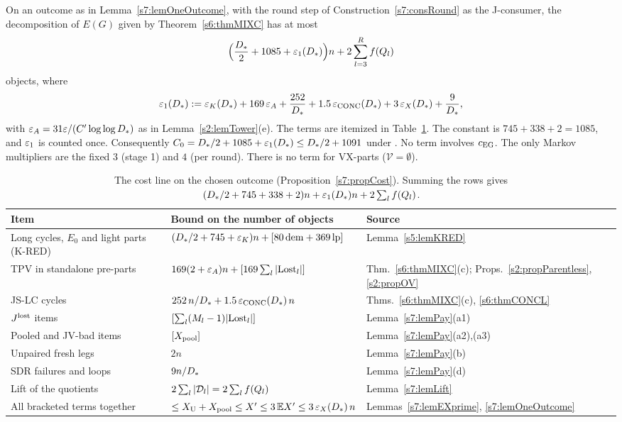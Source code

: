 \begin{proposition}\label{s7:propCost}
On an outcome as in Lemma~\ref{s7:lemOneOutcome}, with the round step of
Construction~\ref{s7:consRound} as the J-consumer, the decomposition of $E(G)$
given by Theorem~\ref{s6:thmMIXC} has at most
\[
\Bigl(\frac{D_{*}}{2}+1085+\varepsilon_{1}(D_{*})\Bigr)n+2\sum_{l=3}^{R}f(Q_l)
\]
objects, where
\[
\varepsilon_{1}(D_{*})\mathrel{:=}\varepsilon_{K}(D_{*})+169\,\varepsilon_{A}+\frac{252}{D_{*}}+1.5\,\varepsilon_{\mathrm{CONC}}(D_{*})+3\,\varepsilon_{X}(D_{*})+\frac{9}{D_{*}},
\]
with $\varepsilon_{A}=31\varepsilon/(C'\log\log D_{*})$ as in Lemma~\ref{s2:lemTower}(e). The
terms are itemized in Table~\ref{s7:tabCost}. The constant is $745+338+2=1085$, and
$\varepsilon_{1}$ is counted once. Consequently
$C_{0}=D_{*}/2+1085+\varepsilon_{1}(D_{*})\le D_{*}/2+1091$ under . No term
involves $c_{\mathrm{EG}}$. The only Markov multipliers are the fixed $3$ (stage 1) and $4$
(per round). There is no term for VX-parts ($\mathcal{V}=\emptyset$).
\deps{\ref{s6:thmMIXC}, \ref{s6:thmCONCL}, \ref{s7:lemLift}, \ref{s7:lemPay}, \ref{s7:lemEXprime}, \ref{s7:lemOneOutcome}, \ref{s5:lemKRED}, \ref{s2:propParentless}, \ref{s2:propOV}, \ref{s7:consRound}, \ref{s2:lemTower}, \ref{s1:condG4}, \ref{s6:defLending}, \ref{s7:defXprime}}
\end{proposition}

\begin{table}[ht]
\centering
\small
\begin{tabular}{|p{5.0cm}|p{6.2cm}|p{3.6cm}|}
\hline
\textbf{Item} & \textbf{Bound on the number of objects} & \textbf{Source}\\
\hline
Long cycles, $E_0$ and light parts (K-RED) & $(D_{*}/2+745+\varepsilon_{K})n+[80\,\mathrm{dem}+369\,\mathrm{lp}]$ & Lemma~\ref{s5:lemKRED}\\
TPV in standalone pre-parts & $169(2+\varepsilon_{A})n+[169\sum_l|\mathrm{Lost}_l|]$ & Thm.~\ref{s6:thmMIXC}(c); Props.~\ref{s2:propParentless}, \ref{s2:propOV}\\
JS-LC cycles & $252\,n/D_{*}+1.5\,\varepsilon_{\mathrm{CONC}}(D_{*})\,n$ & Thms.~\ref{s6:thmMIXC}(c), \ref{s6:thmCONCL}\\
$J^{\mathrm{lost}}$ items & $[\sum_l(M_l-1)|\mathrm{Lost}_l|]$ & Lemma~\ref{s7:lemPay}(a1)\\
Pooled and JV-bad items & $[X_{\mathrm{pool}}]$ & Lemma~\ref{s7:lemPay}(a2),(a3)\\
Unpaired fresh legs & $2n$ & Lemma~\ref{s7:lemPay}(b)\\
SDR failures and loops & $9n/D_{*}$ & Lemma~\ref{s7:lemPay}(d)\\
Lift of the quotients & $2\sum_l|\mathcal{D}_l|=2\sum_lf(Q_l)$ & Lemma~\ref{s7:lemLift}\\
\hline
All bracketed terms together & $\le X_{\mathrm{U}}+X_{\mathrm{pool}}\le X'\le3\,\mathbb{E}X'\le3\,\varepsilon_{X}(D_{*})\,n$ & Lemmas~\ref{s7:lemEXprime}, \ref{s7:lemOneOutcome}\\
\hline
\end{tabular}
\caption{The cost line on the chosen outcome (Proposition~\ref{s7:propCost}).
Summing the rows gives $(D_{*}/2+745+338+2)n+\varepsilon_{1}(D_{*})n+2\sum_lf(Q_l)$.}
\label{s7:tabCost}
\end{table}

